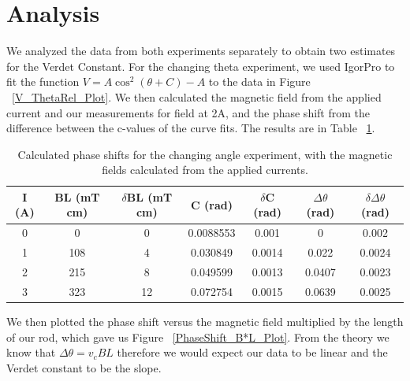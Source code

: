 \documentclass[prb,preprint]{revtex4-1}
\begin{document}
\section{Analysis}

We analyzed the data from both experiments separately to obtain two estimates for the Verdet Constant.  For the changing theta experiment, we used IgorPro to fit the function $V = A \cos ^2 (\theta + C) - A$ to the data in Figure ~\ref{V_ThetaRel_Plot}.  We then calculated the magnetic field from the applied current and our measurements for field at 2A, and the phase shift from the difference between the c-values of the curve fits.  The results are in Table ~\ref{B*L_PhaseShift_Table}.  

\begin{table}[h!]
\centering
\caption{Calculated phase shifts for the changing angle experiment, with the magnetic fields calculated from the applied currents.}
\begin{ruledtabular}
\begin{tabular}{c c c c c c c}
I (A) & BL (mT cm) & $\delta$BL (mT cm) & C (rad)& $\delta$C (rad) & $\Delta \theta$ (rad) & $\delta \Delta \theta$ (rad)\\
\hline	%
0 &  0  & 0 &  0.0088553 & 0.001 & 0 & 0.002    \\
1 & 108 & 4  & 0.030849  & 0.0014 & 0.022  & 0.0024 \\
2 & 215 & 8 & 0.049599  & 0.0013 & 0.0407 & 0.0023  \\
3 & 323 & 12 & 0.072754  & 0.0015 & 0.0639 & 0.0025 
\end{tabular}
\end{ruledtabular}
\label{B*L_PhaseShift_Table}
\end{table}

We then plotted the phase shift versus the magnetic field multiplied by the length of our rod, which gave us Figure ~\ref{PhaseShift_B*L_Plot}. From the theory we know that $\Delta \theta = v_c B L$ therefore we would expect our data to be linear and the Verdet constant to be the slope.
\end{document}
